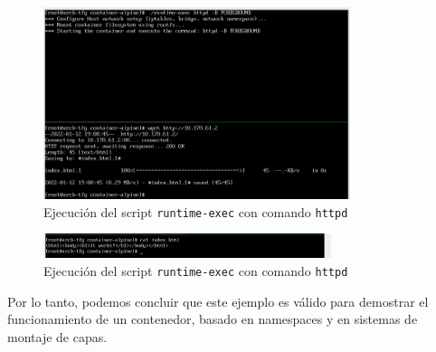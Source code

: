 \documentclass[12pt]{article}
\begin{document}
\begin{enumerate}
		\pagebreak
		
		\begin{figure}[h!]
			\begin{center}
				\includegraphics[width=0.8\textwidth]{img/container_runtime3.png}
				\caption{Ejecución del script \texttt{runtime-exec} con comando \texttt{httpd}}
			\end{center}
		\end{figure}
	
		\begin{figure}[h!]
			\begin{center}
				\includegraphics[width=0.75\textwidth]{img/container_runtime4.png}
				\caption{Ejecución del script \texttt{runtime-exec} con comando \texttt{httpd}}
			\end{center}
		\end{figure}
		
		\noindent Por lo tanto, podemos concluir que este ejemplo es válido para demostrar el funcionamiento de un contenedor, basado en namespaces y en sistemas de montaje de capas.
		
	\end{enumerate}
	
	\pagebreak
	
\end{document}

